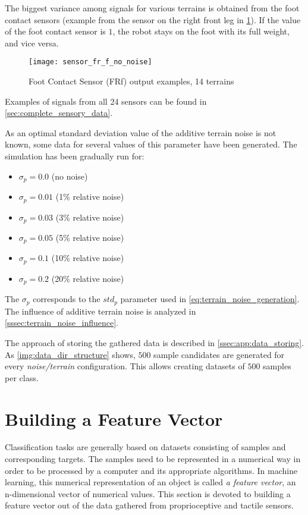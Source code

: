 The biggest variance among signals for various terrains is obtained from the foot contact sensors (example from the sensor on the right front leg in \cref{fig:sensor_fr_f_no_noise}). If the value of the foot contact sensor is $ 1 $, the robot stays on the foot with its full weight, and vice versa.

\begin{figure}[H]
  \centering
  \texttt{[image: sensor\_fr\_f\_no\_noise]}
  \caption{Foot Contact Sensor (FRf) output examples, 14 terrains}
  \label{fig:sensor_fr_f_no_noise}
\end{figure}

Examples of signals from all 24 sensors can be found in \cref{sec:complete_sensory_data}.

As an optimal standard deviation value of the additive terrain noise is not known, some data for several values of this parameter have been generated. The simulation has been gradually run for:

\begin{itemize}
\item $ \sigma_p = 0.0 $ (no noise)
\item $ \sigma_p = 0.01 $ (1\% relative noise)
\item $ \sigma_p = 0.03 $ (3\% relative noise)
\item $ \sigma_p = 0.05 $ (5\% relative noise)
\item $ \sigma_p = 0.1 $ (10\% relative noise)
\item $ \sigma_p = 0.2 $ (20\% relative noise)
\end{itemize}

The $ \sigma_p $ corresponds to the $ std_p $ parameter used in \cref{eq:terrain_noise_generation}. The influence of additive terrain noise is analyzed in \cref{sssec:terrain_noise_influence}.

The approach of storing the gathered data is described in \cref{ssec:app:data_storing}. As \cref{img:data_dir_structure} shows, $ 500 $ sample candidates are generated for every \textit{noise/terrain} configuration. This allows creating datasets of $ 500 $ samples per class.

\section{Building a Feature Vector} \label{sec:feature_vector_compilation}
Classification tasks are generally based on datasets consisting of samples and corresponding targets. The samples need to be represented in a numerical way in order to be processed by a computer and its appropriate algorithms. In machine learning, this numerical representation of an object is called \textit{a feature vector}, an n-dimensional vector of numerical values. This section is devoted to building a feature vector out of the data gathered from proprioceptive and tactile sensors.

